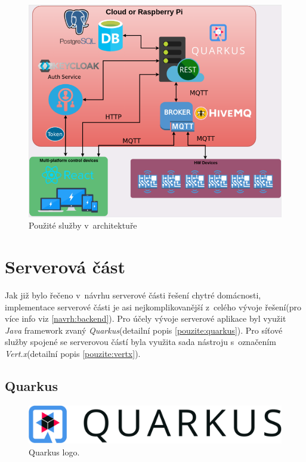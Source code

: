 \begin{figure}[hbt]
  \centering
  \includegraphics[width=0.9 \linewidth]{obrazky-figures/technologie.png}
  \caption{Použité služby v~architektuře}
  \label{figure:technologie_architektura}
\end{figure}

\newpage
\section{Serverová část}
\label{pouzite:backend}
Jak již bylo řečeno v~návrhu serverové části řešení chytré domácnosti, implementace serverové části je asi nejkomplikovanější z~celého vývoje řešení(pro více info viz \ref{navrh:backend}).
Pro účely vývoje serverové aplikace byl využit \emph{Java} framework zvaný \emph{Quarkus}(detailní popis \ref{pouzite:quarkus}).
Pro síťové služby spojené se serverovou částí byla využita sada nástroju s~označením \emph{Vert.x}(detailní popis \ref{pouzite:vertx}).

\subsection*{Quarkus}
\label{pouzite:quarkus}

\begin{figure}[!ht]
  \centering
  \includegraphics[width=.45 \linewidth]{obrazky-figures/quarkus_logo.png}
  \caption{Quarkus logo.~\cite{quarkus:website}}
  \label{figure:quarkus_logo}
\end{figure}

